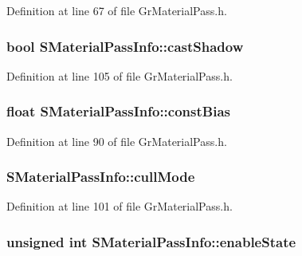 Definition at line 67 of file GrMaterialPass.h.\hypertarget{struct_s_material_pass_info_148b9b02c76e38c6be30dc599ad35dad}{
\subsubsection[{castShadow}]{\setlength{\rightskip}{0pt plus 5cm}bool {\bf SMaterialPassInfo::castShadow}}}
\label{struct_s_material_pass_info_148b9b02c76e38c6be30dc599ad35dad}




Definition at line 105 of file GrMaterialPass.h.\hypertarget{struct_s_material_pass_info_e2071f6643a25e1f3866adb9b33c5079}{
\subsubsection[{constBias}]{\setlength{\rightskip}{0pt plus 5cm}float {\bf SMaterialPassInfo::constBias}}}
\label{struct_s_material_pass_info_e2071f6643a25e1f3866adb9b33c5079}




Definition at line 90 of file GrMaterialPass.h.\hypertarget{struct_s_material_pass_info_1c5a2ded6a57901feed193d620db014e}{
\subsubsection[{cullMode}]{ {\bf SMaterialPassInfo::cullMode}}}
\label{struct_s_material_pass_info_1c5a2ded6a57901feed193d620db014e}




Definition at line 101 of file GrMaterialPass.h.\hypertarget{struct_s_material_pass_info_b4f60776995332748e40270d6c2dc318}{
\subsubsection[{enableState}]{\setlength{\rightskip}{0pt plus 5cm}unsigned int {\bf SMaterialPassInfo::enableState}}}
\label{struct_s_material_pass_info_b4f60776995332748e40270d6c2dc318}




